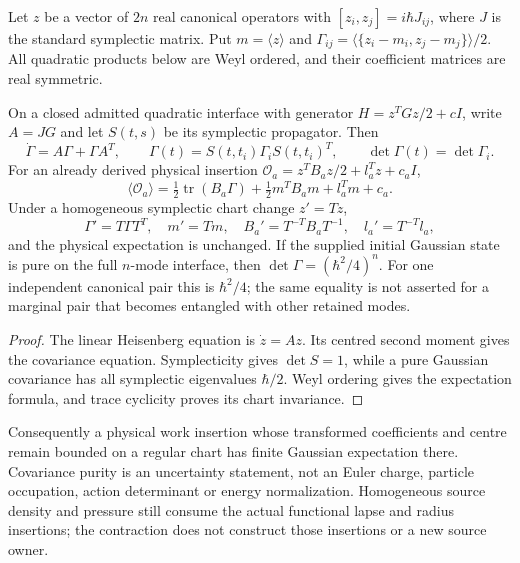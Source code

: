 \documentclass[12pt,a4paper]{article}
\begin{document}
Let \(z\) be a vector of \(2n\) real canonical operators with
\([z_i,z_j]=i\hbar J_{ij}\), where \(J\) is the standard symplectic
matrix.  Put \(m=\langle z\rangle\) and
\(\Gamma_{ij}=\langle\{z_i-m_i,z_j-m_j\}\rangle/2\).
All quadratic products below are Weyl ordered, and their coefficient
matrices are real symmetric.

\begin{theorem}
\label{p4:thm:v2203-gaussian-physical-work}
On a closed admitted quadratic interface with generator
\(H=z^TGz/2+cI\), write \(A=JG\) and let \(S(t,s)\) be its symplectic
propagator.  Then
\[
 \dot\Gamma=A\Gamma+\Gamma A^T,\qquad
 \Gamma(t)=S(t,t_i)\Gamma_iS(t,t_i)^T,
 \qquad \det\Gamma(t)=\det\Gamma_i.
\]
For an already derived physical insertion
\(\mathcal O_a=z^TB_az/2+l_a^Tz+c_aI\),
\[
 \boxed{\langle\mathcal O_a\rangle
 =\tfrac12\operatorname{tr}(B_a\Gamma)
  +\tfrac12m^TB_am+l_a^Tm+c_a.}
\]
Under a homogeneous symplectic chart change \(z'=Tz\),
\[
 \Gamma'=T\Gamma T^T,\quad m'=Tm,\quad
 B_a'=T^{-T}B_aT^{-1},\quad l_a'=T^{-T}l_a,
\]
and the physical expectation is unchanged.  If the supplied initial
Gaussian state is pure on the full \(n\)-mode interface, then
\(\det\Gamma=(\hbar^2/4)^n\).  For one independent canonical pair
this is \(\hbar^2/4\); the same equality is not asserted for a marginal
pair that becomes entangled with other retained modes.
\end{theorem}
\begin{proof}
The linear Heisenberg equation is \(\dot z=Az\).  Its centred second
moment gives the covariance equation.  Symplecticity gives
\(\det S=1\), while a pure Gaussian covariance has all symplectic
eigenvalues \(\hbar/2\).  Weyl ordering gives the expectation formula,
and trace cyclicity proves its chart invariance.
\end{proof}
Consequently a physical work insertion whose transformed coefficients and
centre remain bounded on a regular chart has finite Gaussian expectation
there.  Covariance purity is an uncertainty statement, not an Euler
charge, particle occupation, action determinant or energy normalization.
Homogeneous source density and pressure still consume the actual
functional lapse and radius insertions; the contraction does not
construct those insertions or a new source owner.
\end{document}
